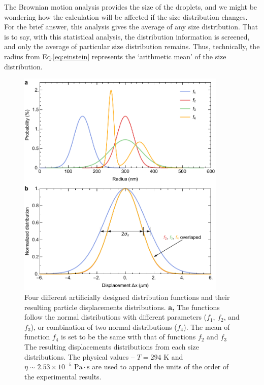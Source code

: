 The Brownian motion analysis provides the size of the droplets, and we might be wondering how the calculation will be affected if the size distribution changes. For the brief answer, this analysis gives the average of any size distribution. That is to say, with this statistical analysis, the distribution information is screened, and only the average of particular size distribution remains. Thus, technically, the radius from Eq.\ref{eq:einstein} represents the `arithmetic mean' of the size distribution.

\begin{figure}[ht!]
\centering
\includegraphics[width=100mm]{figures/ch2/Brownian/distributionEffect.pdf}
\caption{Four different artificially designed distribution functions and their resulting particle displacements distributions. \textbf{a,} The functions follow the normal distributions with different parameters ($f_1$, $f_2$, and $f_3$), or combination of two normal distributions ($f_4$). The mean of function $f_4$ is set to be the same with that of functions $f_2$ and $f_3$  The resulting displacements distributions from each size distributions. The physical values -- $T=294 \text{ K}$ and $\eta \sim 2.53\times10^{-5} \text{ Pa}\cdot\text{s}$ are used to append the units of the order of the experimental results.}
\label{fig:distributionEffect}
\end{figure}

